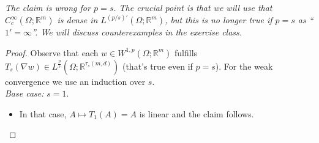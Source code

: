 \textit{The claim is wrong for $p=s$. The crucial point is that we will use that $C_c^\infty(\Omega;\mathbb{R}^m)$ is dense in $L^{(p/s)'}(\Omega;\mathbb{R}^m)$, but this is no longer true if $p=s$ as ``$1'=\infty$''. We will discuss counterexamples in the exercise class.}\\

\begin{proof}
Observe that each $w\in W^{1,p}(\Omega;\mathbb{R}^m)$ fulfills $T_s(\nabla w)\in L^{\frac{p}{s}}(\Omega;\mathbb{R}^{\tau_s(m,d)})$ (that's true even if $p=s$). For the weak convergence we use an induction over $s$.\\

\textit{Base case:} $s=1$.
\begin{itemize}
	\item[] In that case, $A\longmapsto T_1(A)=A$ is linear and the claim follows.\\
\end{itemize}


\end{proof}
